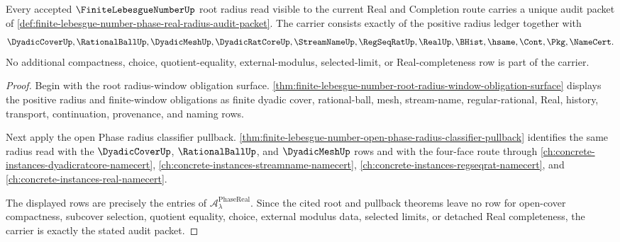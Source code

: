 \begin{theorem}
\label{thm:finite-lebesgue-number-phase-real-radius-audit-carrier}
Every accepted $\FiniteLebesgueNumberUp$ root radius read visible to the current Real and Completion route carries a unique audit packet of \autoref{def:finite-lebesgue-number-phase-real-radius-audit-packet}. The carrier consists exactly of the positive radius ledger together with
$$
\DyadicCoverUp,\RationalBallUp,\DyadicMeshUp,\DyadicRatCoreUp,\StreamNameUp,\RegSeqRatUp,\RealUp,\BHist,\hsame,\Cont,\Pkg,\NameCert .
$$
No additional compactness, choice, quotient-equality, external-modulus, selected-limit, or Real-completeness row is part of the carrier.
\end{theorem}
\begin{proof}
Begin with the root radius-window obligation surface. \autoref{thm:finite-lebesgue-number-root-radius-window-obligation-surface} displays the positive radius and finite-window obligations as finite dyadic cover, rational-ball, mesh, stream-name, regular-rational, Real, history, transport, continuation, provenance, and naming rows.

Next apply the open Phase radius classifier pullback. \autoref{thm:finite-lebesgue-number-open-phase-radius-classifier-pullback} identifies the same radius read with the $\DyadicCoverUp$, $\RationalBallUp$, and $\DyadicMeshUp$ rows and with the four-face route through \autoref{ch:concrete-instances-dyadicratcore-namecert}, \autoref{ch:concrete-instances-streamname-namecert}, \autoref{ch:concrete-instances-regseqrat-namecert}, and \autoref{ch:concrete-instances-real-namecert}.

The displayed rows are precisely the entries of $\mathcal{A}_{\lambda}^{\mathrm{PhaseReal}}$. Since the cited root and pullback theorems leave no row for open-cover compactness, subcover selection, quotient equality, choice, external modulus data, selected limits, or detached Real completeness, the carrier is exactly the stated audit packet.
\end{proof}

